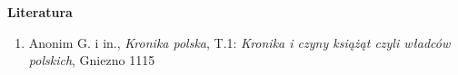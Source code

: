 \pagestyle {empty}

\vspace*{1.3cm}

{\Huge\textbf{Literatura}}

\vspace*{1cm}

\begin{enumerate}[\lbrack 1\rbrack]
	\item Anonim G. i in., \textit{Kronika polska}, T.1: \textit{Kronika i czyny książąt czyli władców polskich}, Gniezno 1115
\end{enumerate}

